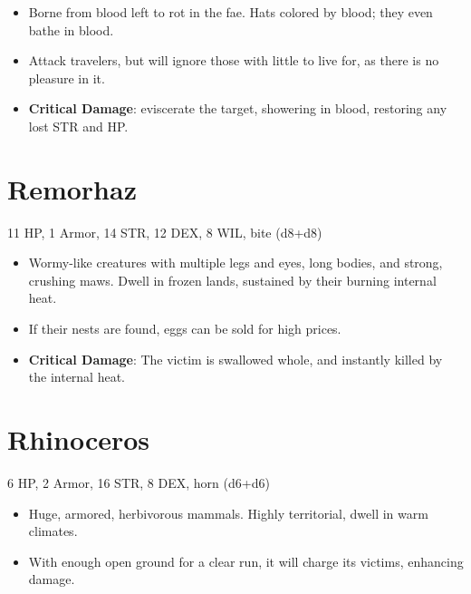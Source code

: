 \documentclass[
  10pt,
  american,
]{article}
\begin{document}
\begin{samepage}
\begin{itemize}
\setlength\itemsep{-.5em}
\item Borne from blood left to rot in the fae. Hats colored by blood; they even bathe in blood.
\item Attack travelers, but will ignore those with little to live for, as there is no pleasure in it.
\item \textbf{Critical Damage}: eviscerate the target, showering in blood, restoring any lost STR and HP.
\end{itemize}
\end{samepage}

\hypertarget{remorhaz}{%
\section{Remorhaz}\label{remorhaz}}

11 HP, 1 Armor, 14 STR, 12 DEX, 8 WIL, bite (d8+d8)

\begin{samepage}
\begin{itemize}
\setlength\itemsep{-.5em}
\item Wormy-like creatures with multiple legs and eyes, long bodies, and strong, crushing maws. Dwell in frozen lands, sustained by their burning internal heat.
\item If their nests are found, eggs can be sold for high prices.
\item \textbf{Critical Damage}: The victim is swallowed whole, and instantly killed by the internal heat.
\end{itemize}
\end{samepage}

\hypertarget{rhinoceros}{%
\section{Rhinoceros}\label{rhinoceros}}

6 HP, 2 Armor, 16 STR, 8 DEX, horn (d6+d6)

\begin{samepage}
\begin{itemize}
\setlength\itemsep{-.5em}
\item Huge, armored, herbivorous mammals. Highly territorial, dwell in warm climates.
\item With enough open ground for a clear run, it will charge its victims, enhancing damage.
\end{itemize}
\end{samepage}
\end{document}
